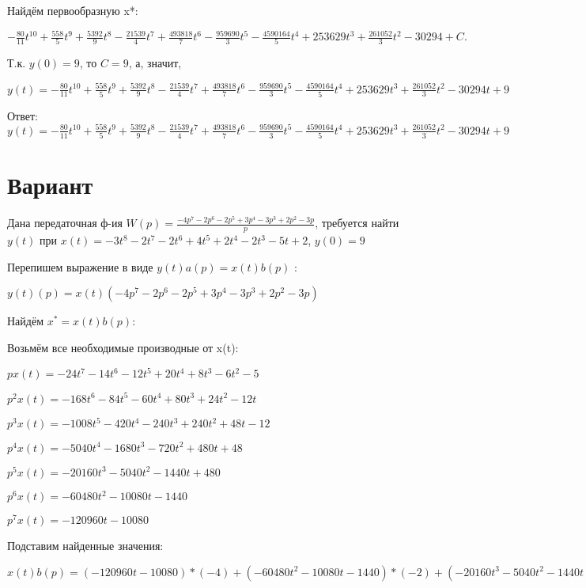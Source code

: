\documentclass{article}
\begin{document}
{{{{Найдём первообразную x*:

$-\frac{80}{11}t^{10}+\frac{558}{5}t^{9}+\frac{5392}{9}t^{8}-\frac{21539}{4}t^{7}+\frac{493818}{7}t^{6}-\frac{959690}{3}t^{5}-\frac{4590164}{5}t^{4}+253629t^{3}+\frac{261052}{3}t^{2}-30294+C.$

Т.к. $y(0)=9$, то $C=9$, а, значит, 

$y(t)=-\frac{80}{11}t^{10}+\frac{558}{5}t^{9}+\frac{5392}{9}t^{8}-\frac{21539}{4}t^{7}+\frac{493818}{7}t^{6}-\frac{959690}{3}t^{5}-\frac{4590164}{5}t^{4}+253629t^{3}+\frac{261052}{3}t^{2}-30294t+9$

Ответ: $y(t) = -\frac{80}{11}t^{10}+\frac{558}{5}t^{9}+\frac{5392}{9}t^{8}-\frac{21539}{4}t^{7}+\frac{493818}{7}t^{6}-\frac{959690}{3}t^{5}-\frac{4590164}{5}t^{4}+253629t^{3}+\frac{261052}{3}t^{2}-30294t+9$

\section{Вариант}

Дана передаточная ф-ия $W(p)=\frac{-4p^{7}-2p^{6}-2p^{5}+3p^{4}-3p^{3}+2p^{2}-3p}{p}$, требуется найти $y(t)$ при $x(t)=-3t^{8}-2t^{7}-2t^{6}+4t^{5}+2t^{4}-2t^{3}-5t+2$, $y(0)=9$

Перепишем выражение в виде $y(t)a(p)=x(t)b(p)$ :

$y(t)(p)=x(t)(-4p^{7}-2p^{6}-2p^{5}+3p^{4}-3p^{3}+2p^{2}-3p)$

Найдём $x^*=x(t)b(p)$:

Возьмём все необходимые производные от x(t):

$px(t)=-24t^{7}-14t^{6}-12t^{5}+20t^{4}+8t^{3}-6t^{2}-5$

$p^2x(t)=-168t^{6}-84t^{5}-60t^{4}+80t^{3}+24t^{2}-12t$

$p^3x(t)=-1008t^{5}-420t^{4}-240t^{3}+240t^{2}+48t-12$

$p^4x(t)=-5040t^{4}-1680t^{3}-720t^{2}+480t+48$

$p^5x(t)=-20160t^{3}-5040t^{2}-1440t+480$

$p^6x(t)=-60480t^{2}-10080t-1440$

$p^7x(t)=-120960t-10080$

Подставим найденные значения:

$x(t)b(p) = (-120960t-10080)*(-4)+(-60480t^{2}-10080t-1440)*(-2)+(-20160t^{3}-5040t^{2}-1440t+480)*(-2)+(-5040t^{4}-1680t^{3}-720t^{2}+480t+48)*3+(-1008t^{5}-420t^{4}-240t^{3}+240t^{2}+48t-12)*(-3)+(-168t^{6}-84t^{5}-60t^{4}+80t^{3}+24t^{2}-12t)*2+(-24t^{7}-14t^{6}-12t^{5}+20t^{4}+8t^{3}-6t^{2}-5)*(-3)+=72t^{7}-294t^{6}+2892t^{5}-14040t^{4}+36136t^{3}+128226t^{2}+508152t$





}}}}
\end{document}
